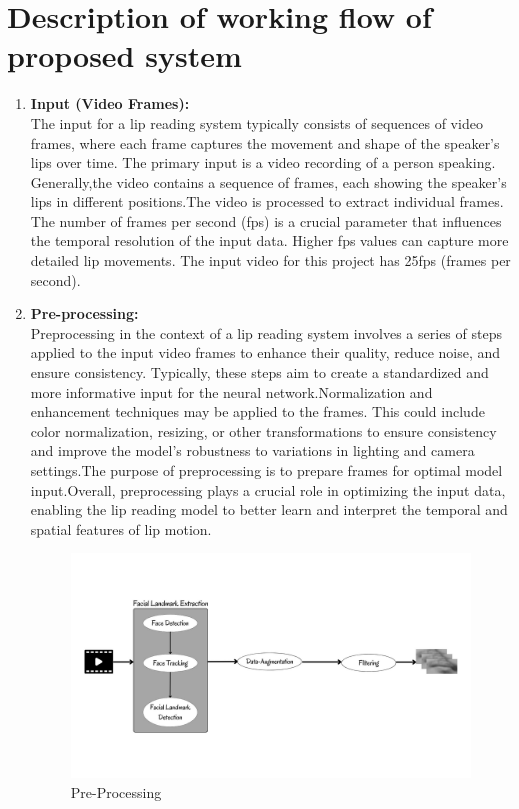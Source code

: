 \section{Description of working flow of proposed system}
\begin{enumerate}
	\item \textbf{Input (Video Frames):}
	\\ The input for a lip reading system typically consists of sequences of video frames, where each frame captures the movement and shape of the speaker's lips over time. The primary input is a video recording of a person speaking. Generally,the video contains a sequence of frames, each showing the speaker's lips in different positions.The video is processed to extract individual frames. The number of frames per second (fps) is a crucial parameter that influences the temporal resolution of the input data. Higher fps values can capture more detailed lip movements. The input video for this project has 25fps (frames per second).
	\item \textbf{Pre-processing:}
	\\Preprocessing in the context of a lip reading system involves a series of steps applied to the input video frames to enhance their quality, reduce noise, and ensure consistency. Typically, these steps aim to create a standardized and more informative input for the neural network.Normalization and enhancement techniques may be applied to the frames. This could include color normalization, resizing, or other transformations to ensure consistency and improve the model's robustness to variations in lighting and camera settings.The purpose of preprocessing is to prepare frames for optimal model input.Overall, preprocessing plays a crucial role in optimizing the input data, enabling the lip reading model to better learn and interpret the temporal and spatial features of lip motion.

	
	\begin{figure}[h]
	\centering
	\includegraphics[width=\linewidth]{img/pre-processing.jpg}
	\caption{Pre-Processing}
	

\end{figure}
\end{enumerate}
